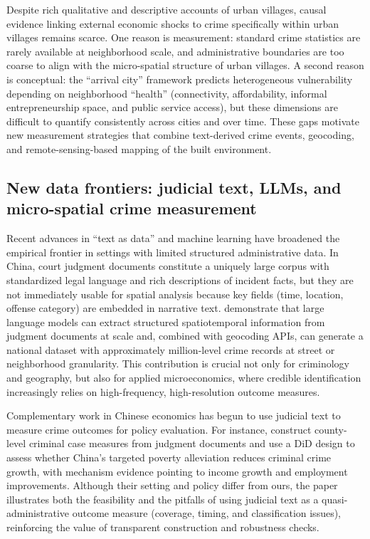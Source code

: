 Despite rich qualitative and descriptive accounts of urban villages, causal evidence linking external economic shocks to crime specifically within urban villages remains scarce. One reason is measurement: standard crime statistics are rarely available at neighborhood scale, and administrative boundaries are too coarse to align with the micro-spatial structure of urban villages. A second reason is conceptual: the ``arrival city'' framework predicts heterogeneous vulnerability depending on neighborhood ``health'' (connectivity, affordability, informal entrepreneurship space, and public service access), but these dimensions are difficult to quantify consistently across cities and over time. These gaps motivate new measurement strategies that combine text-derived crime events, geocoding, and remote-sensing-based mapping of the built environment.

\subsection{New data frontiers: judicial text, LLMs, and micro-spatial crime measurement}
\label{subsec:llm_crime_data}

Recent advances in ``text as data'' and machine learning have broadened the empirical frontier in settings with limited structured administrative data. In China, court judgment documents constitute a uniquely large corpus with standardized legal language and rich descriptions of incident facts, but they are not immediately usable for spatial analysis because key fields (time, location, offense category) are embedded in narrative text. \citet{zhang2025llm} demonstrate that large language models can extract structured spatiotemporal information from judgment documents at scale and, combined with geocoding APIs, can generate a national dataset with approximately million-level crime records at street or neighborhood granularity. This contribution is crucial not only for criminology and geography, but also for applied microeconomics, where credible identification increasingly relies on high-frequency, high-resolution outcome measures.

Complementary work in Chinese economics has begun to use judicial text to measure crime outcomes for policy evaluation. For instance, \citet{yi2023povertycrime} construct county-level criminal case measures from judgment documents and use a DiD design to assess whether China's targeted poverty alleviation reduces criminal crime growth, with mechanism evidence pointing to income growth and employment improvements. Although their setting and policy differ from ours, the paper illustrates both the feasibility and the pitfalls of using judicial text as a quasi-administrative outcome measure (coverage, timing, and classification issues), reinforcing the value of transparent construction and robustness checks.

